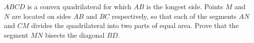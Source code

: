 $ ABCD$ is a convex quadrilateral for which $ AB$ is the longest side. Points $ M$ and $ N$ are located on sides $ AB$ and $ BC$ respectively, so that each of the segments $ AN$ and $ CM$ divides the quadrilateral into two parts of equal area. Prove that the segment $ MN$ bisects the diagonal $ BD$.